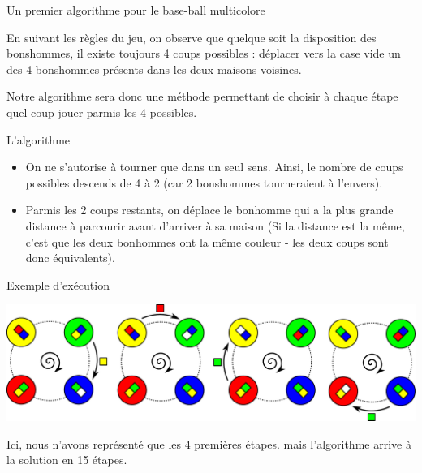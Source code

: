 \begin{frame}{Un premier algorithme pour le base-ball multicolore}

  En suivant les règles du jeu, on observe que quelque soit la disposition des bonshommes, il existe toujours 4 coups possibles : déplacer vers la case vide un des 4 bonshommes présents dans les deux maisons voisines.

  Notre algorithme sera donc une méthode permettant de choisir à chaque étape quel coup jouer parmis les 4 possibles.

  \begin{block}{L'algorithme}
    \begin{itemize}
    \item On ne s'autorise à tourner que dans un seul sens. Ainsi, le nombre de coups possibles descends de 4 à 2 (car 2 bonshommes tourneraient à l'envers).
    \item Parmis les 2 coups restants, on déplace le bonhomme qui a la plus grande distance à parcourir avant d'arriver à sa maison (Si la distance est la même, c'est que les deux bonhommes ont la même couleur - les deux coups sont donc équivalents).
    \end{itemize}
  \end{block}

  \begin{block}{Exemple d'exécution}
    \begin{center}
      \includegraphics[width=\linewidth]{img/baseball_ex1.pdf}
    \end{center}

  Ici, nous n'avons représenté que les 4 premières étapes. mais l'algorithme arrive à la solution en 15 étapes.
  \end{block}
\end{frame}

